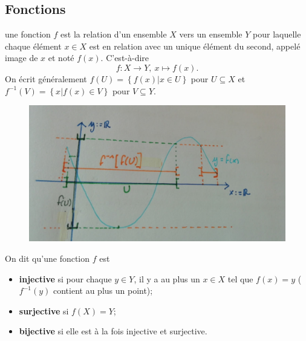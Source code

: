 \subsection{Fonctions}

\begin{definition}
    une fonction $f$ est la relation d'un ensemble $X$ vers un ensemble $Y$ pour laquelle chaque élément $x\in X$ est en relation avec un unique élément du second, appelé image de $x$ et noté $f(x)$. C'est-à-dire
    \begin{equation*}
        f:X\rightarrow Y,\ x\mapsto f(x).
    \end{equation*}
    On écrit généralement $f(U) = \left\{ f(x)|x\in U \right\}$ pour $U\subseteq X$ et $f^{-1}(V) = \left\{ x|f(x)\in V \right\}$ pour $V\subseteq Y$.
\end{definition}

\begin{figure}[H]
    \centering
    \includegraphics[scale = 0.1]{synthese_fct.jpg}
\end{figure}

\begin{definition}
    On dit qu'une fonction $f$ est
    \begin{itemize}
        \item \textbf{injective} si pour chaque $y \in Y$, il y a au plus un $x \in X$ tel que $f(x) = y$ ($f^{-1}(y)$ contient au plus un point);
        \item \textbf{surjective} si $f(X)=Y$;
        \item \textbf{bijective} si elle est à la fois injective et surjective.
    \end{itemize}
\end{definition}

